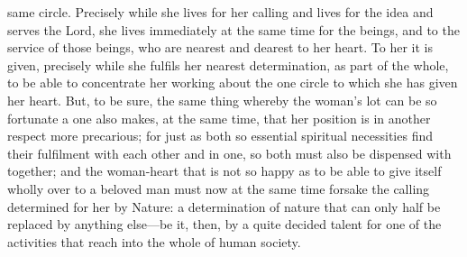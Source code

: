 \documentclass[12pt,a4paper]{book}
\begin{document}
same circle. Precisely while she lives for her calling and lives for the
idea and serves the Lord, she lives immediately at the same time for the
beings, and to the service of those beings, who are nearest and dearest to
her heart. To her it is given, precisely while she fulfils her nearest
determination, as part of the whole, to be able to concentrate her working
about the one circle to which she has given her heart. But, to be sure, the
same thing whereby the woman's lot can be so fortunate a one also makes, at
the same time, that her position is in another respect more precarious; for
just as both so essential spiritual necessities find their fulfilment with
each other and in one, so both must also be dispensed with together; and
the woman-heart that is not so happy as to be able to give itself wholly
over to a beloved man must now at the same time forsake the calling
determined for her by Nature: a determination of nature that can only half
be replaced by anything else---be it, then, by a quite decided talent for
one of the activities that reach into the whole of human society.
\end{document}
